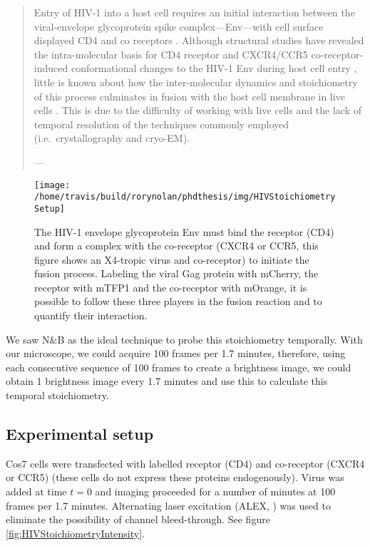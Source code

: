 \documentclass[12pt,]{book}
\theoremstyle{definition}
\theoremstyle{definition}
\theoremstyle{definition}
\theoremstyle{remark}
\begin{document}
\begin{quote}
Entry of HIV-1 into a host cell requires an initial interaction between
the viral-envelope glycoprotein spike complex---Env---with cell surface
displayed CD4 and co receptors \citep{Jakobsdottir}. Although structural
studies have revealed the intra-molecular basis for CD4 receptor and
CXCR4/CCR5 co-receptor-induced conformational changes to the HIV-1 Env
during host cell entry \citep{Ozorowski}, little is known about how the
inter-molecular dynamics and stoichiometry of this process culminates in
fusion with the host cell membrane in live cells \citep{Brandenberg}.
This is due to the difficulty of working with live cells and the lack of
temporal resolution of the techniques commonly employed
(i.e.~crystallography and cryo-EM).

--- \citet{HIVstoichiometry}
\end{quote}









\begin{figure}

\texttt{[image: /home/travis/build/rorynolan/phdthesis/img/HIVStoichiometrySetup]} \hfill{}

\caption{The HIV-1 envelope glycoprotein Env
must bind the receptor (CD4) and form a complex with the co-receptor
(CXCR4 or CCR5, this figure shows an X4-tropic virus and co-receptor) to
initiate the fusion process. Labeling the viral Gag protein with
mCherry, the receptor with mTFP1 and the co-receptor with mOrange, it is
possible to follow these three players in the fusion reaction and to
quantify their interaction.}\label{fig:HIVStoichiometrySetup}
\end{figure}

We saw N\&B as the ideal technique to probe this stoichiometry
temporally. With our microscope, we could acquire 100 frames per 1.7
minutes, therefore, using each consecutive sequence of 100 frames to
create a brightness image, we could obtain 1 brightness image every 1.7
minutes and use this to calculate this temporal stoichiometry.

\subsection{Experimental setup}\label{experimental-setup}

Cos7 cells were transfected with labelled receptor (CD4) and co-receptor
(CXCR4 or CCR5) (these cells do not express these proteins
endogenously). Virus was added at time \(t=0\) and imaging proceeded for
a number of minutes at 100 frames per 1.7 minutes. Alternating laser
excitation (ALEX, \citet{ALEX}) was used to eliminate the possibility of
channel bleed-through. See figure \ref{fig:HIVStoichiometryIntensity}.
\end{document}
